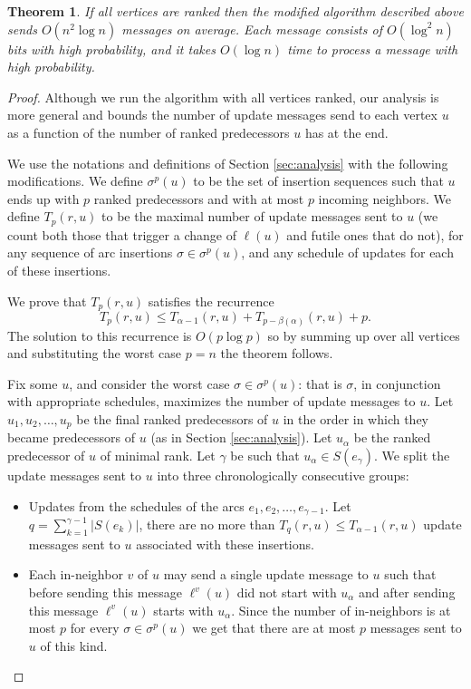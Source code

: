 \documentclass[11pt]{article}
\theoremstyle{plain}
\newtheorem{thm}{Theorem}[section]
\theoremstyle{definition}
\theoremstyle{remark}
\numberwithin{equation}{section}
\begin{document}
\begin{thm}
If all vertices are ranked then the modified algorithm described
above sends $O(n^2\log n)$ messages on average. Each message
consists
 of $O(\log^2 n)$ bits with high probability, and it takes $O(\log
 n)$ time to process a message with high probability.
\end{thm}
\begin{proof}
Although we run the algorithm with all vertices ranked, our analysis
is more general and bounds the number of update messages send to
each vertex $u$ as a function of the number of ranked predecessors
$u$ has at the end.

We use the notations and definitions of Section \ref{sec:analysis}
with the following modifications. We define $\sigma^p(u)$ to be the
set of insertion sequences such that $u$ ends up with $p$ ranked
predecessors and with at most $p$ incoming neighbors. We define
 $T_p(r,u)$ to be
the maximal number of update messages sent  to $u$ (we count both
those that trigger a change of $\ell(u)$ and futile ones that do
not), for any sequence of arc insertions $\sigma \in \sigma^p(u)$,
and any schedule of updates for each of these insertions.

We prove that  $T_p(r,u)$ satisfies the recurrence
$$T_p(r,u) \leq T_{\alpha-1}(r,u) + T_{p-\beta(\alpha)}(r,u) + p.$$
The solution to this recurrence is $O(p\log p)$ so by summing up
over all vertices and substituting the worst case $p=n$ the theorem
follows.

Fix some $u$, and consider the worst case $\sigma\in \sigma^p(u)$:
that is $\sigma$, in conjunction with appropriate schedules,
maximizes the number of update messages to $u$. Let
 $u_1,u_2,\ldots,u_p$ be the final ranked predecessors of $u$ in the order
 in which they became predecessors of $u$ (as in Section \ref{sec:analysis}).
  Let $u_\alpha$ be the ranked predecessor of $u$ of minimal rank.
Let $\gamma$ be such that $u_{\alpha} \in S(e_\gamma)$.
  We split the update messages sent to $u$ into three chronologically consecutive groups:
  \begin{itemize}
    \item Updates from the schedules of the arcs $e_1, e_2, \ldots, e_{\gamma-1}$. Let $q=\sum_{k=1}^{\gamma-1} |S(e_k)|$, there are no more than $T_q(r,u) \leq T_{\alpha-1}(r,u)$
    update messages sent to $u$ associated with these insertions.

    \item Each in-neighbor $v$ of $u$ may send  a single update
    message to $u$ such that before sending this message $\ell^v(u)$
    did not start with $u_\alpha$ and after sending this message $\ell^v(u)$
starts with
    $u_\alpha$. Since the number of in-neighbors
    is at most $p$ for every $\sigma \in \sigma^p(u)$ we get that there are
    at most $p$ messages sent to $u$ of this kind.



\end{itemize}
\end{proof}
\end{document}
